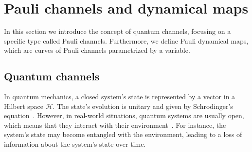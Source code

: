 \documentclass[10pt,letterpaper]{article} %
\providecommand{\DIFaddend}{} %
\DeclareRobustCommand{\DIFaddend}{\DIFOaddend \let\includegraphics\DIFOincludegraphics} %
\begin{document}



\DIFaddend %
\section{Pauli channels and dynamical maps}  \label{sec: Pauli Channels} %


In this section  we introduce the concept of quantum channels, focusing on a
specific type called Pauli channels.  Furthermore, we define Pauli dynamical
maps, which are curves of Pauli channels parametrized by a variable.
\subsection{Quantum channels} \label{subsec: Quantum Channels} %


In quantum mechanics, a closed system's state is represented by a vector in a
Hilbert space $\mathcal{H}$.  The state's evolution is unitary and given by
Schrodinger's equation~\cite{Rieffel}.  However, in real-world situations,
quantum systems are usually open, which means that they interact with their
environment~\cite{breuer2007theory}.  For instance, the system's state may become
entangled with the environment, leading to a loss of information about the
system's state over time.
\end{document}
